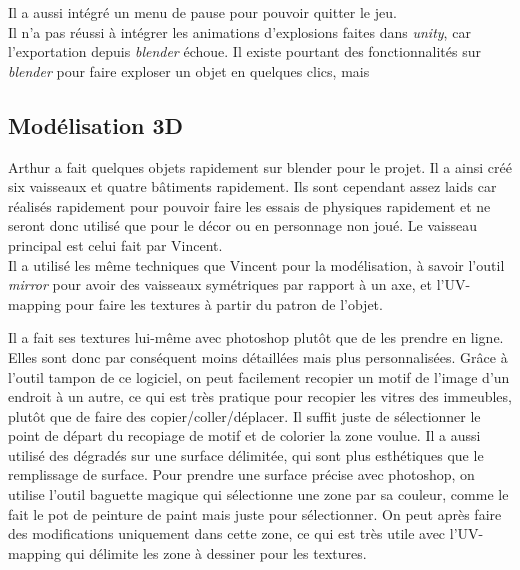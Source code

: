 \documentclass[10pt, titlepage]{report}
\begin{document}
Il a aussi intégré un menu de pause pour pouvoir quitter le jeu.\\

Il n'a pas réussi à intégrer les animations d'explosions faites dans \textit{unity}, car l'exportation depuis \textit{blender} échoue. Il existe pourtant des fonctionnalités sur \textit{blender} pour faire exploser un objet en quelques clics, mais

\subsection{Modélisation 3D}
Arthur a fait quelques objets rapidement sur blender pour le projet. Il a ainsi créé six vaisseaux et quatre bâtiments rapidement. Ils sont cependant assez laids car réalisés rapidement pour pouvoir faire les essais de physiques rapidement et ne seront donc utilisé que pour le décor ou en personnage non joué. Le vaisseau principal est celui fait par Vincent.\\

Il a utilisé les même techniques que Vincent pour la modélisation, à savoir l'outil \textit{mirror} pour avoir des vaisseaux symétriques par rapport à un axe, et  l'UV-mapping pour faire les textures à partir du patron de l'objet.

Il a fait ses textures lui-même avec photoshop plutôt que de les prendre en ligne. Elles sont donc par conséquent moins détaillées mais plus personnalisées. Grâce à l'outil tampon de ce logiciel, on peut facilement recopier un motif de l'image d'un endroit à un autre, ce qui est très pratique pour recopier les vitres des immeubles, plutôt que de faire des copier/coller/déplacer. Il suffit juste de sélectionner le point de départ du recopiage de motif et de colorier la zone voulue. Il a aussi utilisé des dégradés sur une surface délimitée, qui sont plus esthétiques que le remplissage de surface. Pour prendre une surface précise avec photoshop, on utilise l'outil baguette magique qui sélectionne une zone par sa couleur, comme le fait le pot de peinture de paint mais juste pour sélectionner. On peut après faire des modifications uniquement dans cette zone, ce qui est très utile avec l'UV-mapping qui délimite les zone à dessiner pour les textures.\\
\end{document}
